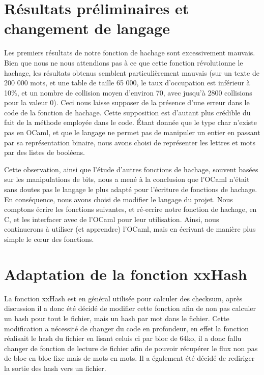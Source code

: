 \documentclass[final,twoside,article,10pt]{scrartcl}
\begin{document}
\section{Résultats préliminaires et changement de langage}
    Les premiers résultats de notre fonction de hachage sont excessivement mauvais.
    Bien que nous ne nous attendions pas à ce que cette fonction révolutionne le hachage, les résultats obtenus semblent particulièrement mauvais (sur un texte de 200 000 mots, et une table de taille 65 000, le taux d'occupation est inférieur à 10\%, et un nombre de collision moyen d'environ 70, avec jusqu'à 2800 collisions pour la valeur 0).
    Ceci nous laisse supposer de la présence d'une erreur dans le code de la fonction de hachage.
    Cette supposition est d'autant plus crédible du fait de la méthode employée dans le code.
    \'Etant donnée que le type char n'existe pas en OCaml, et que le langage ne permet pas de manipuler un entier en passant par sa représentation binaire, nous avons choisi de représenter les lettres et mots par des listes de booléens.
    \par Cette observation, ainsi que l'étude d'autres fonctions de hachage, souvent basées sur les manipulations de bits, nous a mené à la conclusion que l'OCaml n'était sans doutes pas le langage le plus adapté pour l'écriture de fonctions de hachage. En conséquence, nous avons choisi de modifier le langage du projet.
    Nous comptons écrire les fonctions suivantes, et ré-ecrire notre fonction de hachage, en C, et les interfacer avec de l'OCaml pour leur utilisation.
    Ainsi, nous continuerons à utiliser (et apprendre) l'OCaml, mais en écrivant de manière plus simple le c\oe ur des fonctions.
    
    \section{Adaptation de la fonction xxHash}
    La fonction xxHash est en général utilisée pour calculer des checksum, après discussion il a donc été décidé de modifier 
    cette fonction afin de non pas calculer un hash pour tout le fichier, mais un hash par mot dans le fichier. Cette modification a nécessité de changer du code en profondeur, en effet la fonction réalisait le hash du fichier en lisant celuis ci par bloc de 64ko, il a donc fallu changer de fonction de lecture de fichier afin de pouvoir récupérer le flux non pas de bloc en bloc fixe mais de mots en mots. Il a également été décidé de rediriger la sortie des hash vers un fichier.
\end{document}
